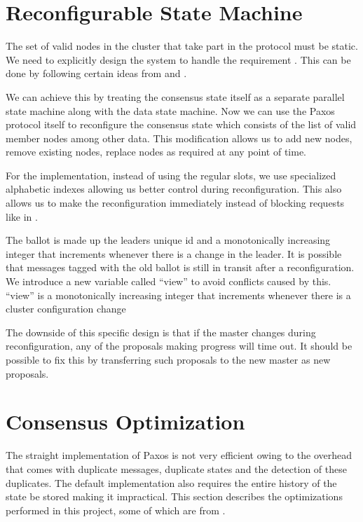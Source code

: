 \section{Reconfigurable State Machine}
\label{section:a.n.d.reconfig}

The set of valid nodes in the cluster that take part in the protocol must
be static. We need to explicitly design the system to handle the requirement
. This can be done by following certain
ideas from \citet{LamportSP08} and \citet{LamportMZ10}.

We can achieve this by treating the consensus state itself as a separate
parallel state machine along with the data state machine. Now we can use
the Paxos protocol itself to reconfigure the consensus state which consists
of the list of valid member nodes among other data. This modification allows
us to add new nodes, remove existing nodes, replace nodes as required at any
point of time.

For the implementation, instead of using the regular slots, we use specialized
alphabetic indexes allowing us better control during reconfiguration. This also
allows us to make the reconfiguration immediately instead of blocking requests
like in \citet{LamportSP08}.

The ballot is made up the leaders unique id and a monotonically increasing
integer that increments whenever there is a change in the leader. It is possible
that messages tagged with the old ballot is still in transit after a
reconfiguration. We introduce a new variable called ``view'' to avoid conflicts
caused by this. ``view'' is a monotonically increasing integer that increments
whenever there is a cluster configuration change

The downside of this specific design is that if the master changes during
reconfiguration, any of the proposals making progress will time out. It
should be possible to fix this by transferring such proposals to the new master
as new proposals.

\section{Consensus Optimization}
\label{section:consensus.optimization}

The straight implementation of Paxos is not very efficient owing to the overhead
that comes with duplicate messages, duplicate states and the detection of these
duplicates. The default implementation also requires the entire history of the
state be stored making it impractical. This section describes the optimizations
performed in this project, some of which are from \citet{Robbert2011}.

